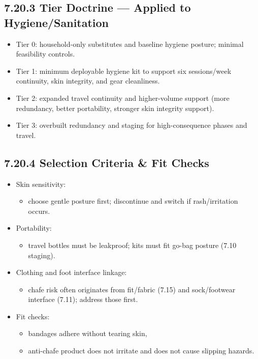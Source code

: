 \documentclass[10pt]{article}
\begin{document}
\subsection*{7.20.3 Tier Doctrine — Applied to Hygiene/Sanitation}
{}

\begin{itemize}
\item Tier 0: household-only substitutes and baseline hygiene posture; minimal feasibility controls.
\item Tier 1: minimum deployable hygiene kit to support six sessions/week continuity, skin integrity, and gear cleanliness.
\item Tier 2: expanded travel continuity and higher-volume support (more redundancy, better portability, stronger skin integrity support).
\item Tier 3: overbuilt redundancy and staging for high-consequence phases and travel.
\end{itemize}

\subsection*{7.20.4 Selection Criteria \& Fit Checks}
{}

\begin{itemize}
\item Skin sensitivity:
  \begin{itemize}
  \item choose gentle posture first; discontinue and switch if rash/irritation occurs.
  \end{itemize}
\item Portability:
  \begin{itemize}
  \item travel bottles must be leakproof; kits must fit go-bag posture (7.10 staging).
  \end{itemize}
\item Clothing and foot interface linkage:
  \begin{itemize}
  \item chafe risk often originates from fit/fabric (7.15) and sock/footwear interface (7.11); address those first.
  \end{itemize}
\item Fit checks:
  \begin{itemize}
  \item bandages adhere without tearing skin,
  \item anti-chafe product does not irritate and does not cause slipping hazards.
  \end{itemize}
\end{itemize}
\end{document}
